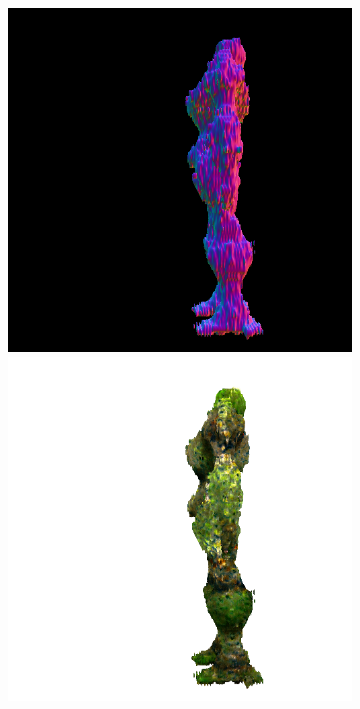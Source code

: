 \begin{figure}[ht]
\begin{subfigure}[b]{0.222\textwidth}
        \includegraphics[width=\textwidth]{etc/a robot made out of plants/magic123/magic123_refine_robot_left_0_part2.png}
        \includegraphics[width=\textwidth]{etc/a robot made out of plants/magic123/magic123_refine_robot_left_0_part1.png}

\end{subfigure}
\end{figure}
